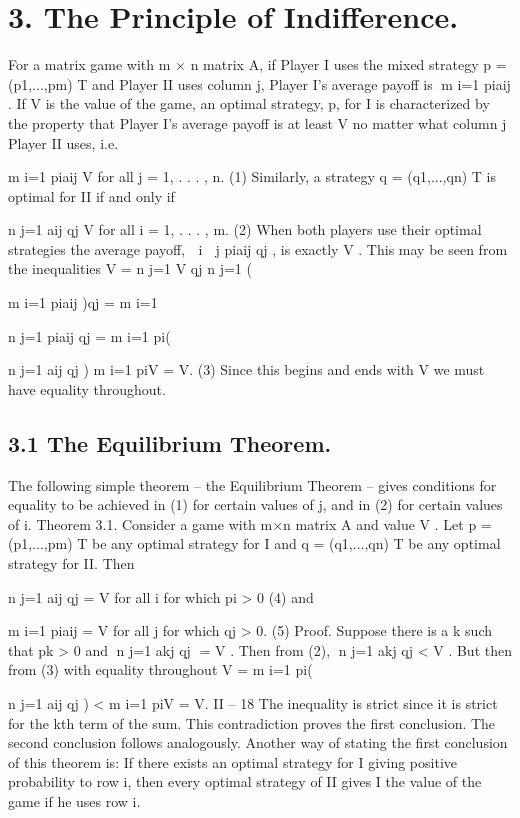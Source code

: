 

\section{3. The Principle of Indifference.}
For a matrix game with m × n matrix A, if Player I uses the mixed strategy p =
(p1,...,pm)
T and Player II uses column j, Player I’s average payoff is m
i=1 piaij . If V is
the value of the game, an optimal strategy, p, for I is characterized by the property that
Player I’s average payoff is at least V no matter what column j Player II uses, i.e.

m
i=1
piaij \geq V for all j = 1, . . . , n. (1)
Similarly, a strategy q = (q1,...,qn)
T is optimal for II if and only if

n
j=1
aij qj \leq V for all i = 1, . . . , m. (2)
When both players use their optimal strategies the average payoff, 
i

j piaij qj , is exactly
V . This may be seen from the inequalities
V = 
n
j=1
V qj \leq 
n
j=1
(

m
i=1
piaij )qj = 
m
i=1

n
j=1
piaij qj
= 
m
i=1
pi(

n
j=1
aij qj ) \leq 
m
i=1
piV = V.
(3)
Since this begins and ends with V we must have equality throughout.

\subsection{3.1 The Equilibrium Theorem.} The following simple theorem – the Equilibrium
Theorem – gives conditions for equality to be achieved in (1) for certain values of j, and
in (2) for certain values of i.
Theorem 3.1. Consider a game with m×n matrix A and value V . Let p = (p1,...,pm)
T
be any optimal strategy for I and q = (q1,...,qn)
T be any optimal strategy for II. Then

n
j=1
aij qj = V for all i for which pi > 0 (4)
and

m
i=1
piaij = V for all j for which qj > 0. (5)
Proof. Suppose there is a k such that pk > 0 and n
j=1 akj qj = V . Then from (2),
n
j=1 akj qj < V . But then from (3) with equality throughout
V = 
m
i=1
pi(

n
j=1
aij qj ) < 
m
i=1
piV = V.
II – 18
The inequality is strict since it is strict for the kth term of the sum. This contradiction
proves the first conclusion. The second conclusion follows analogously.
Another way of stating the first conclusion of this theorem is: If there exists an optimal
strategy for I giving positive probability to row i, then every optimal strategy of II gives
I the value of the game if he uses row i.

